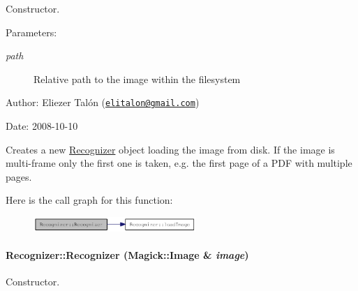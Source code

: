 Constructor. 

\begin{Desc}
\item[Parameters:]
\begin{description}
\item[{\em path}]Relative path to the image within the filesystem\end{description}
\end{Desc}
\begin{Desc}
\item[Author:]Eliezer Talón (\href{mailto:elitalon@gmail.com}{\tt elitalon@gmail.com}) \end{Desc}
\begin{Desc}
\item[Date:]2008-10-10\end{Desc}
Creates a new \hyperlink{class_recognizer}{Recognizer} object loading the image from disk. If the image is multi-frame only the first one is taken, e.g. the first page of a PDF with multiple pages. 

Here is the call graph for this function:\nopagebreak
\begin{figure}[H]
\begin{center}
\leavevmode
\includegraphics[width=175pt]{class_recognizer_50ffc181208bb07ae651aba6249ee7e4_cgraph}
\end{center}
\end{figure}
\hypertarget{class_recognizer_01e0b85a6ad9cfbf6fcab4fe4b294640}{
\paragraph[{Recognizer}]{\setlength{\rightskip}{0pt plus 5cm}Recognizer::Recognizer (Magick::Image \& {\em image})}\hfill}
\label{class_recognizer_01e0b85a6ad9cfbf6fcab4fe4b294640}


Constructor. 

